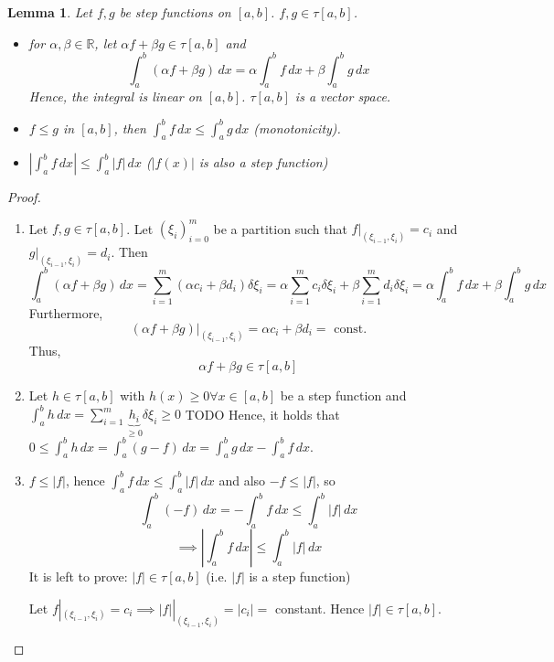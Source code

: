 \documentclass{article}
\newtheorem{lemma}{Lemma}  \numberwithin{lemma}{section}
\newcommand{\card}[1]{\left|#1\right|}
\begin{document}
\begin{lemma} %
  Let $f,g$ be step functions on $[a,b]$. $f,g \in \tau[a,b]$.
  \begin{itemize}
    \item
      for $\alpha, \beta \in \mathbb R$, let $\alpha f + \beta g \in \tau[a,b]$ and
      \[ \int_a^b (\alpha f + \beta g) \, dx = \alpha \int_a^bf \, dx + \beta \int_a^b g \, dx \]
      Hence, the integral is linear on $[a,b]$. $\tau[a,b]$ is a vector space.
    \item $f \leq g$ in $[a,b]$, then $\int_a^b f \, dx \leq \int_a^b g \, dx$ (monotonicity).
    \item $\card{\int_a^b f \, dx} \leq \int_a^b \card{f} \, dx$ ($\card{f(x)}$ is also a step function)
  \end{itemize}
\end{lemma}

\begin{proof}
  \begin{enumerate}
    \item
      Let $f,g \in \tau[a,b]$. Let $(\xi_i)_{i=0}^m$ be a partition such that
      $f|_{(\xi_{i-1},\xi_i)} = c_i$ and $g|_{(\xi_{i-1},\xi_i)} = d_i$.
      Then
      \[
        \int_a^b (\alpha f + \beta g) \, dx = \sum_{i=1}^m (\alpha c_i + \beta d_i) \delta \xi_i
        = \alpha \sum_{i=1}^m c_i \delta \xi_i + \beta \sum_{i=1}^m d_i \delta \xi_i
        = \alpha \int_a^b f \, dx + \beta \int_a^b g \, dx
      \]
      Furthermore,
      \[ (\alpha f + \beta g)|_{(\xi_{i-1},\xi_i)} = \alpha c_i + \beta d_i = \text{ const.} \]
      Thus,
      \[ \alpha f + \beta g \in \tau[a,b] \]
    \item
      Let $h \in \tau[a,b]$ with $h(x) \geq 0 \forall x \in [a,b]$ be a step function
      and $\int_a^b h \, dx = \sum_{i=1}^m \underbrace{h_i}_{\geq 0} \delta \xi_i \geq 0$
      TODO
      Hence, it holds that $0 \leq \int_a^b h \, dx = \int_a^b (g - f) \, dx = \int_a^b g \, dx - \int_a^b f \, dx$.
    \item
      $f \leq \card{f}$, hence $\int_a^b f \, dx \leq \int_a^b \card{f} \, dx$ and also
      $-f \leq \card{f}$, so
      \[ \int_a^b (-f) \, dx = -\int_a^b f \, dx \leq \int_a^b \card{f} \, dx \]
      \[ \implies \card{\int_a^b f \, dx} \leq \int_a^b \card{f} \, dx \]
      It is left to prove: $\card{f} \in \tau[a,b]$ (i.e. $\card{f}$ is a step function)

      Let $f|_{(\xi_{i-1}, \xi_i)} = c_i \implies \card{f}|_{(\xi_{i-1}, \xi_i)} = \card{c_i} = $ constant.
      Hence $\card{f} \in \tau[a,b]$.
  \end{enumerate}
\end{proof}
\end{document}

